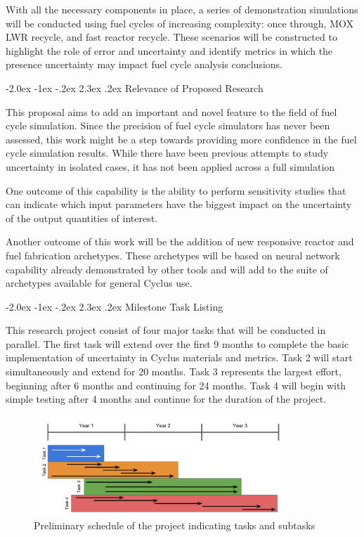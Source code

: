 \documentclass[dvips,12pt]{article}
\makeatletter
\renewcommand\section{\@startsection {section}{1}{\z@}%
                                   {-2.0ex \@plus -1ex \@minus -.2ex}%
                                   {2.3ex \@plus.2ex}%
                                   {\normalfont\bfseries}}%
\makeatother
\begin{document}
With all the necessary components in place, a
series of demonstration simulations will be
conducted using fuel cycles of increasing
complexity: once through, MOX LWR recycle, and
fast reactor recycle.  These scenarios will be
constructed to highlight the role of error and
uncertainty and identify metrics in which the
presence uncertainty may impact fuel cycle
analysis conclusions.

\section{Relevance of Proposed Research}

This proposal aims to add an important and novel
feature to the field of fuel cycle simulation.
Since the precision of fuel cycle simulators has
never been assessed, this work might be a step
towards providing more confidence in the fuel
cycle simulation results.  While there have been
previous attempts to study uncertainty in isolated
cases\cite{visionEcon}, it has not been applied
across a full simulation

One outcome of this capability is the ability to
perform sensitivity studies that can indicate
which input parameters have the biggest impact on
the uncertainty of the output quantities of
interest.

Another outcome of this work will be the addition
of new responsive reactor and fuel fabrication
archetypes.  These archetypes will be based on
neural network capability already demonstrated by
other tools and will add to the suite of
archetypes available for general Cyclus use.

\section{Milestone Task Listing}

This research project consist of four major tasks
that will be conducted in parallel.  The first
task will extend over the first 9 months to
complete the basic implementation of uncertainty
in Cyclus materials and metrics.  Task 2 will
start simultaneously and extend for 20 months.
Task 3 represents the largest effort, beginning
after 6 months and continuing for 24 months.  Task
4 will begin with simple testing after 4 months
and continue for the duration of the project.

\begin{figure}[h!]
\centering
\includegraphics[width=0.85\textwidth]	{timeline}
\caption{Preliminary schedule of the project indicating tasks and subtasks}
\label{fig:progression}
\end{figure}
\end{document}
